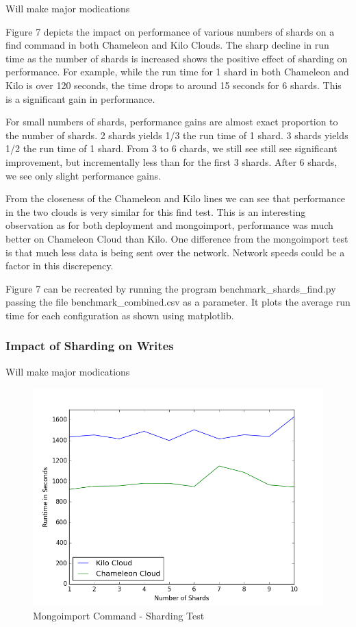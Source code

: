 \documentclass[9pt,twocolumn,twoside]{../../styles/osajnl}
\begin{document}
Will make major modications

Figure 7 depicts the impact on performance of various numbers of shards on a find command in both Chameleon and Kilo Clouds.  The sharp decline in run time as the number of shards is increased shows the positive effect of sharding on performance.  For example, while the run time for 1 shard in both Chameleon and Kilo is over 120 seconds, the time drops to around 15 seconds for 6 shards.  This is a significant gain in performance.  

For small numbers of shards, performance gains are almost exact proportion to the number of shards.  2 shards yields 1/3 the run time of 1 shard.  3 shards yields 1/2 the run time of 1 shard.  From 3 to 6 chards, we still see still see significant improvement, but incrementally less than for the first 3 shards.  After 6 shards, we see only slight performance gains.

From the closeness of the Chameleon and Kilo lines we can see that performance in the two clouds is very similar for this find test.  This is an interesting observation as for both deployment and mongoimport, performance was much better on Chameleon Cloud than Kilo.  One difference from the mongoimport test is that much less data is being sent over the network.  Network speeds could be a factor in this discrepency.

Figure 7 can be recreated by running the program benchmark\_shards\_find.py passing the file benchmark\_combined.csv as a parameter.  It plots the average run time for each configuration as shown using matplotlib.



\subsubsection{Impact of Sharding on Writes}

Will make major modications

\begin{figure}[!ht]
  \includegraphics[scale=0.45]{images/shard_import.png}
  \caption{Mongoimport Command - Sharding Test}
\end{figure}
\end{document}
